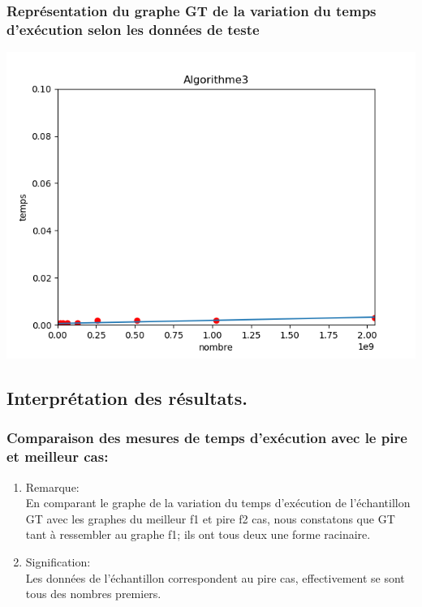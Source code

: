 \documentclass[12pt]{article}
\begin{document}
\subsubsection{Représentation du graphe GT de la variation du temps d'exécution selon les données de teste}

\includegraphics[width=1\textwidth]{graphe/Algorithme3.png}

\subsection{Interprétation des résultats.}
\subsubsection{Comparaison des mesures de temps d'exécution avec le pire et meilleur cas:}
\begin{enumerate}
	\item Remarque: \\
	En comparant le graphe de la variation du temps d'exécution de l'échantillon GT avec les graphes du meilleur f1 et pire f2 cas, nous constatons que GT tant à ressembler au graphe f1; ils ont tous deux une forme  racinaire.
	\\
	  
	\item Signification:
	\\
	Les données de l'échantillon correspondent au pire cas, effectivement se sont tous des nombres premiers.
	

\end{enumerate}
\end{document}
